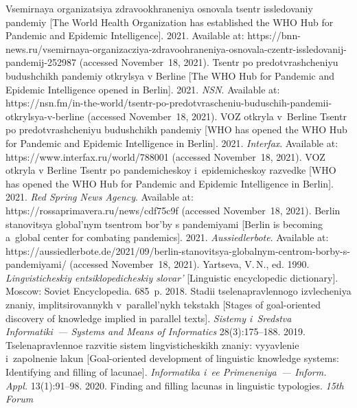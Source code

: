 \begin{multicols}{2}
{{\begin{thebibliography}{99}
Vsemirnaya organizatsiya zdravookhraneniya osnovala tsentr issledovaniy pandemiy [The World 
Health Organization has established the WHO Hub for Pandemic and Epidemic Intelligence]. 2021. 
Available at: {\sf  
https://bnn-news.ru/vsemirnaya-organizacziya-zdravoohraneniya-osnovala-czentr-issledovanij-pandemij-252987} (accessed 
November~18, 2021).
Tsentr po predotvrashcheniyu budushchikh pandemiy otkrylsya v Berline [The WHO Hub for Pandemic 
and Epidemic Intelligence opened in Berlin]. 2021. \textit{NSN}.
Available at: {\sf  
https://nsn.fm/in-the-world/tsentr-po-predotvrascheniu-buduschih-pandemii-otkrylsya-v-berline} 
(accessed November~18, 2021).
VOZ otkryla v~Berline Tsentr po predotvrashcheniyu budushchikh pandemiy [WHO has opened the 
WHO Hub for Pandemic and Epidemic Intelligence in Berlin]. 2021. \textit{Interfax}. Available at: 
{\sf https://www.interfax.ru/\linebreak world/788001} (accessed November~18, 2021).
VOZ otkryla v Berline Tsentr po pandemicheskoy i~epidemicheskoy razvedke [WHO has opened the 
WHO Hub for Pandemic and Epidemic Intelligence in Berlin]. 2021. \textit{Red Spring News Agency}.
Available at: {\sf 
https://\linebreak rossaprimavera.ru/news/cdf75c9f} (accessed November~18, 2021).
Berlin stanovitsya global'nym tsentrom bor'by s pandemiyami [Berlin is becoming a~global center for 
combating pandemics]. 2021. \textit{Aussiedlerbote}. Available at: {\sf  
https://aussiedlerbote.de/2021/09/berlin-\linebreak stanovitsya-globalnym-centrom-borby-s-pandemiyami/} 
(accessed November~18, 2021).
Yartseva, V.\,N., ed. 1990. \textit{Lingvisticheskiy entsiklopedicheskiy slovar'} [Linguistic encyclopedic 
dictionary]. Moscow: Soviet Encyclopedia. 685~p.
 2018. Stadii tselenapravlennogo izvlecheniya znaniy, implitsirovannykh 
v~parallel'nykh tekstakh [Stages of goal-oriented discovery of knowledge implied in parallel texts]. 
\textit{Sistemy i~Sredstva Informatiki~--- Systems and Means of Informatics} 28(3):175--188.
 2019. Tselenapravlennoe razvitie sistem lingvisticheskikh znaniy: vyyavlenie 
i~zapolnenie lakun [Goal-oriented development of linguistic knowledge systems: Identifying and 
filling of lacunae]. \textit{Informatika i~ee Primeneniya~--- Inform. Appl.} 13(1):91--98.
 2020. Finding and filling lacunas in linguistic typologies. \textit{15th Forum 
}
\end{thebibliography}}}
\end{multicols}
